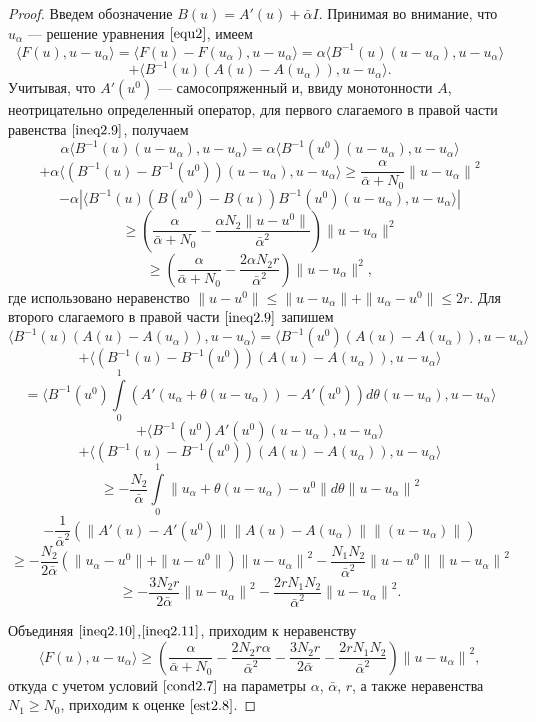 \begin{proof} Введем обозначение $B(u)=A'(u)+\bar\alpha I$. Принимая во внимание, что $u_\alpha$ --- решение уравнения $\eqref{equ2}$, имеем
$$
\langle F(u), u-u_\alpha\rangle=\langle F(u)-F(u_\alpha), u-u_\alpha\rangle=\alpha\langle B^{-1}(u)(u-u_\alpha), u-u_\alpha\rangle$$ \begin{equation}\label{ineq2.9}+\langle B^{-1}(u)(A(u)-A(u_\alpha)), u-u_\alpha\rangle.
\end{equation}
Учитывая, что $A'(u^0)$ --- самосопряженный и, ввиду монотонности $A$, неотрицательно определенный оператор, для первого слагаемого в правой части равенства $\eqref{ineq2.9}$, получаем
$$\alpha\langle B^{-1}(u)(u-u_\alpha), u-u_\alpha\rangle=\alpha\langle B^{-1}(u^0)(u-u_\alpha), u-u_\alpha\rangle$$ $$+\alpha\langle (B^{-1}(u)-B^{-1}(u^0))(u-u_\alpha), u-u_\alpha\rangle \ge \frac{\alpha}{\bar\alpha+N_0}{\|u-u_\alpha\|}^2$$
$$ - \alpha|\langle B^{-1}(u)(B(u^0)-B(u))B^{-1}(u^0)(u-u_\alpha), u-u_\alpha\rangle| $$
$$\ge \left( \frac{\alpha}{\bar\alpha+N_0}-\frac{\alpha N_2\|u-u^0\|}{{\bar\alpha}^2}\right)\|u-u_\alpha\|^2$$
\begin{equation}\label{ineq2.10}
\ge\left(\frac{\alpha}{\bar\alpha+N_0}-\frac{2\alpha N_2r}{{\bar\alpha}^2}\right)\|u-u_\alpha\|^2,
\end{equation} где использовано неравенство $\|u-u^0\|\le\|u-u_\alpha\|+\|u_\alpha-u^0\|\le 2r$.
Для второго слагаемого в правой части $\eqref{ineq2.9}$ запишем
$$ \langle B^{-1}(u)(A(u)-A(u_\alpha)), u-u_\alpha\rangle= \langle B^{-1}(u^0)(A(u)-A(u_\alpha)), u-u_\alpha\rangle$$
$$+\langle (B^{-1}(u)-B^{-1}(u^0))(A(u)-A(u_\alpha)), u-u_\alpha\rangle$$
$$=\langle B^{-1}(u^0)\int\limits_0^1 (A'(u_\alpha+\theta(u-u_\alpha))-A'(u^0))d\theta (u-u_\alpha), u-u_\alpha\rangle$$
$$+ \langle B^{-1}(u^0)A'(u^0)(u-u_\alpha), u-u_\alpha\rangle $$
$$+\langle (B^{-1}(u)-B^{-1}(u^0))(A(u)-A(u_\alpha)), u-u_\alpha\rangle$$
$$\ge-\frac{N_2}{\bar\alpha}\int\limits_0^1\|u_\alpha+\theta(u-u_\alpha)-u^0\|d\theta {\|u-u_\alpha\|}^2 $$
$$-\frac{1}{{\bar\alpha}^2}\left ( \|A'(u)-A'(u^0)\|\|A(u)-A(u_\alpha)\|\|(u-u_\alpha)\|\right ) $$$$ \ge - \frac{N_2}{2\bar\alpha} \left ( \|u_\alpha-u^0\|+\|u-u^0\|\right ){\|u-u_\alpha\|}^2 - \frac{N_1 N_2}{{\bar\alpha}^2}\|u-u^0\| {\|u-u_\alpha\|}^2 $$
\begin{equation}\label{ineq2.11}
\ge -\frac{3N_2r}{2\bar\alpha}{\|u-u_\alpha\|}^2-\frac{2rN_1 N_2}{{\bar\alpha}^2}{\|u-u_\alpha\|}^2.\end{equation}

Объединяя $\eqref{ineq2.10}$,$\eqref{ineq2.11}$, приходим к неравенству $$
\langle F(u), u-u_\alpha\rangle\ge\left (\frac{\alpha}{\bar\alpha+N_0}-\frac{2N_2 r \alpha}{{\bar\alpha}^2}-\frac{3N_2r}{2\bar\alpha}-\frac{2rN_1 N_2}{{\bar\alpha}^2}\right ){\|u-u_\alpha\|}^2, $$ откуда с учетом условий $\eqref{cond2.7}$ на параметры $\alpha$, $\bar\alpha$, $r$, а также неравенства $N_1\ge N_0$, приходим к оценке $\eqref{est2.8}$.
\end{proof}

